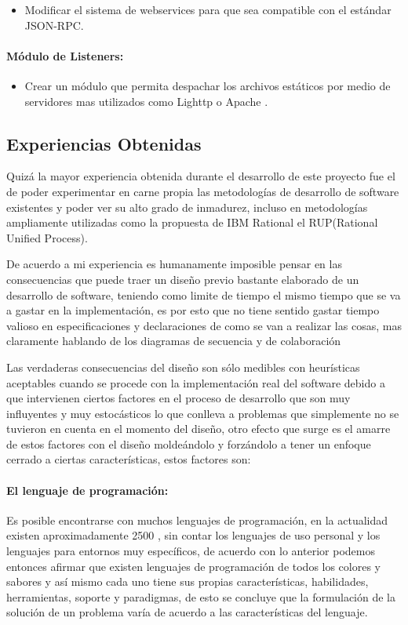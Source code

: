 \begin{itemize}
	\item Modificar el sistema de webservices para que sea compatible con el estándar JSON-RPC. \cite{json-rpc}
\end{itemize}

\paragraph{Módulo de Listeners:}

\begin{itemize}
	\item Crear un módulo que permita despachar los archivos estáticos por medio de servidores mas utilizados como Lighttp \cite{lighttp} o Apache \cite{apache}.
\end{itemize}


\subsection{Experiencias Obtenidas}

Quizá la mayor experiencia obtenida durante el desarrollo de este proyecto fue el de poder experimentar en carne propia las metodologías de desarrollo de software existentes y poder ver su alto grado de inmadurez, incluso en metodologías ampliamente utilizadas como la propuesta de IBM Rational el RUP(Rational Unified Process).

De acuerdo a mi experiencia es humanamente imposible pensar en las consecuencias que puede traer un diseño previo bastante elaborado de un desarrollo de software, teniendo como limite de tiempo el mismo tiempo que se va a gastar en la implementación, es por esto que no tiene sentido gastar tiempo valioso en especificaciones y declaraciones de como se van a realizar las cosas, mas claramente hablando de los diagramas de secuencia y de colaboración

Las verdaderas consecuencias del diseño son sólo medibles con heurísticas aceptables cuando se procede con la implementación real del software debido a que intervienen ciertos factores en el proceso de desarrollo que son muy influyentes y muy estocásticos lo que conlleva a problemas que simplemente no se tuvieron en cuenta en el momento del diseño, otro efecto que surge es el amarre de estos factores con el diseño moldeándolo y forzándolo a tener un enfoque cerrado a ciertas características, estos factores son:

\paragraph{El lenguaje de programación:}
Es posible encontrarse con muchos lenguajes de programación, en la actualidad existen aproximadamente 2500 \cite{bd_lenguajes_programacion}, sin contar los lenguajes de uso personal y los lenguajes para entornos muy específicos, de acuerdo con lo anterior podemos entonces afirmar que existen lenguajes de programación de todos los colores y sabores y así mismo cada uno tiene sus propias características, habilidades, herramientas, soporte y paradigmas, de esto se concluye que la formulación de la solución de un problema varía de acuerdo a las características del lenguaje.


